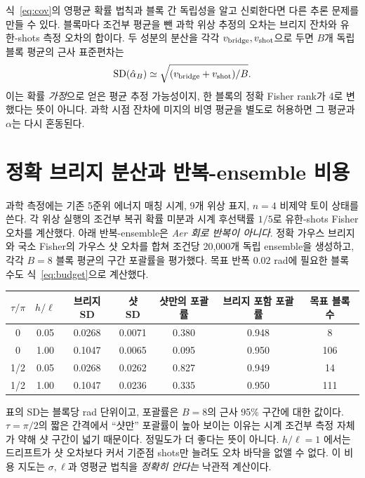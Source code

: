\documentclass[11pt,a4paper]{article}
\begin{document}
식~\eqref{eq:cov}의 영평균 확률 법칙과 블록 간 독립성을 알고
신뢰한다면 다른 추론 문제를 만들 수 있다. 블록마다 조건부 평균을
뺀 과학 위상 추정의 오차는 브리지 잔차와 유한-shots 측정 오차의
합이다. 두 성분의 분산을 각각 $v_{\rm bridge},v_{\rm shot}$으로
두면 $B$개 독립 블록 평균의 근사 표준편차는
\begin{equation}
 \operatorname{SD}(\hat\alpha_B)
 \simeq\sqrt{(v_{\rm bridge}+v_{\rm shot})/B}.
 \label{eq:budget}
\end{equation}
이는 확률 \emph{가정}으로 얻은 평균 추정 가능성이지, 한 블록의
정확 Fisher rank가 4로 변했다는 뜻이 아니다. 과학 시점 잔차에
미지의 비영 평균을 별도로 허용하면 그 평균과 $\alpha$는 다시
혼동된다.

\section{정확 브리지 분산과 반복-ensemble 비용}
과학 측정에는 기존 5준위 에너지 매칭 시계, 9개 위상 표지,
$n=4$ 비제약 토이 상태를 쓴다. 각 위상 실행의 조건부 복귀
확률 미분과 시계 후선택률 $1/5$로 유한-shots Fisher 오차를
계산했다. 아래 반복-ensemble은 \emph{Aer 회로 반복이 아니다}.
정확 가우스 브리지와 국소 Fisher의 가우스 샷 오차를 합쳐 조건당
20,000개 독립 ensemble을 생성하고, 각각 $B=8$ 블록 평균의
구간 포괄률을 평가했다. 목표 반폭 $0.02$ rad에 필요한 블록 수도
식~\eqref{eq:budget}으로 계산했다.
\begin{center}
\begin{tabular}{@{}ccccccc@{}}
\toprule
$\tau/\pi$ & $h/\ell$ & 브리지 SD & 샷 SD & 샷만의 포괄률
& 브리지 포함 포괄률 & 목표 블록 수 \\
\midrule
0 & 0.05 & 0.0268 & 0.0071 & 0.380 & 0.948 & 8 \\
0 & 1.00 & 0.1047 & 0.0065 & 0.095 & 0.950 & 106 \\
1/2 & 0.05 & 0.0268 & 0.0262 & 0.827 & 0.949 & 14 \\
1/2 & 1.00 & 0.1047 & 0.0236 & 0.335 & 0.950 & 111 \\
\bottomrule
\end{tabular}
\end{center}
표의 SD는 블록당 rad 단위이고, 포괄률은 $B=8$의 근사 95\%
구간에 대한 값이다. $\tau=\pi/2$의 짧은 간격에서 ``샷만''
포괄률이 높아 보이는 이유는 시계 조건부 측정 자체가 약해 샷
구간이 넓기 때문이다. 정밀도가 더 좋다는 뜻이 아니다. $h/\ell=1$
에서는 드리프트가 샷 오차보다 커서 기준점 shots만 늘려도
오차 바닥을 없앨 수 없다. 이 비용 지도는 $\sigma,\ell$과
영평균 법칙을 \emph{정확히 안다는} 낙관적 계산이다.
\end{document}

